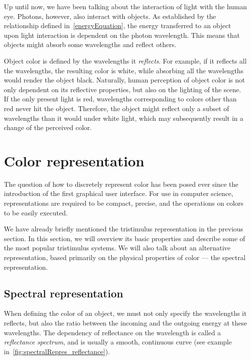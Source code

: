 Up until now, we have been talking about the interaction of light with the human eye. Photons, however, also interact with objects. As established by the relationship defined in~\cref{energyEquation}, the energy transferred to an object upon light interaction is dependent on the photon wavelength. This means that objects might absorb some wavelengths and reflect others.

Object color is defined by the wavelengths it \emph{reflects}. For example, if it reflects all the wavelengths, the resulting color is white, while absorbing all the wavelengths would render the object black. Naturally, human perception of object color is not only dependent on its reflective properties, but also on the lighting of the scene. If the only present light is red, wavelengths corresponding to colors other than red never hit the object. Therefore, the object might reflect only a subset of wavelengths than it would under white light, which may subsequently result in a change of the perceived color.

\section{Color representation} \label{sec:colorRepresentation}

The question of how to discretely represent color has been posed ever since the introduction of the first graphical user interface. For use in computer science, representations are required to be compact, precise, and the operations on colors to be easily executed.

We have already briefly mentioned the tristimulus representation in the previous section. In this section, we will overview its basic properties and describe some of the most popular tristimulus systems. We will also talk about an alternative representation, based primarily on the physical properties of color --- the spectral representation.

\subsection{Spectral representation}

When defining the color of an object, we must not only specify the wavelengths it reflects, but also the ratio between the incoming and the outgoing energy at these wavelengths. The dependency of reflectance on the wavelength is called a \emph{reflectance spectrum}, and is usually a smooth, continuous curve (see example in~\cref{fig:spectralRepres_reflectance}).

